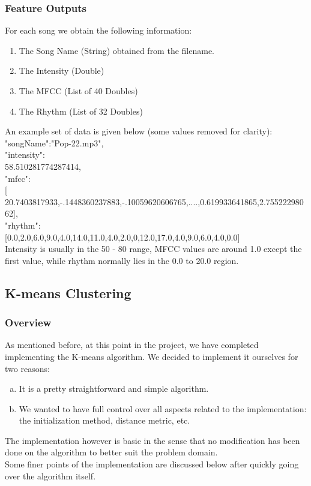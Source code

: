 \subsubsection{Feature Outputs}
For each song we obtain the following information:
\begin{enumerate}
        \item The Song Name (String) obtained from the filename.
        \item The Intensity (Double)
        \item The MFCC (List of 40 Doubles) 
        \item The Rhythm (List of 32 Doubles)
\end{enumerate}
\par An example set of data is given below (some values removed for clarity):\\
{
        \hspace{20cm} "songName":"Pop-22.mp3",\\
        \hspace{20cm} "intensity":\\
        \hspace{20cm} 58.510281774287414,\\
        \hspace{20cm}"mfcc":\\
        \hspace{20cm}[ 20.7403817933,-.1448360237883,-.10059620606765,....,0.619933641865,2.75522298062],\\
        \hspace{20cm}"rhythm":\\
        \hspace{20cm}[0.0,2.0,6.0,9.0,4.0,14.0,11.0,4.0,2.0,0,12.0,17.0,4.0,9.0,6.0,4.0,0.0]\\
}
Intensity is usually in the 50 - 80  range, MFCC values are around 1.0 except the first value, while rhythm normally lies in the 0.0 to 20.0 region.

\subsection{K-means Clustering}

\subsubsection{Overview}
As mentioned before, at this point in the project, we have completed implementing the K-means algorithm.
We decided to implement it ourselves for two reasons: 
\begin{enumerate}[a.)]
        \item It is a pretty straightforward and simple algorithm.
        \item We wanted to have full control over all aspects related to the implementation: the initialization method, distance metric, etc.
\end{enumerate}
The implementation however is basic in the sense that no modification has been done on the algorithm to better suit the problem domain.\\ 
Some finer points of the implementation are discussed below after quickly going over the algorithm itself. 

